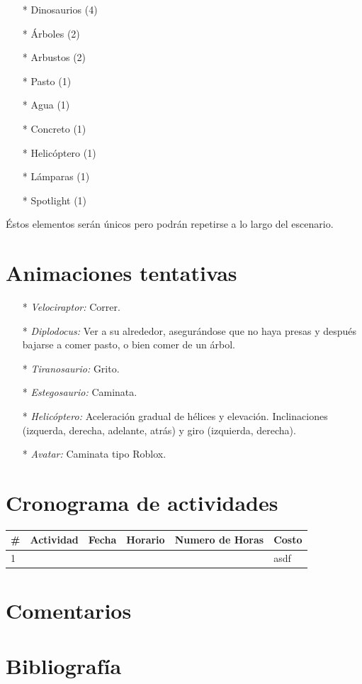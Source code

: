 \documentclass[12pt]{article} %
\begin{document}
	\begin{itemize}
		\item[*] Dinosaurios (4)
		\item[*] Árboles (2)
		\item[*] Arbustos (2)
		\item[*] Pasto (1)
		\item[*] Agua (1)
		\item[*] Concreto (1)
		\item[*] Helicóptero (1)
		\item[*] Lámparas (1)
		\item[*] Spotlight (1)
 	\end{itemize}
 	
 	Éstos elementos serán únicos pero podrán repetirse a lo largo del escenario.
 	
 	\section{Animaciones tentativas}
	
	\begin{itemize}
		\item[*] \emph{Velociraptor:} Correr.
		\item[*] \emph{Diplodocus:} Ver a su alrededor, asegurándose que no haya presas y después bajarse a comer pasto, 
					o bien comer de un árbol.
		\item[*] \emph{Tiranosaurio:} Grito.
		\item[*] \emph{Estegosaurio:} Caminata.
		\item[*] \emph{Helicóptero:} Aceleración gradual de hélices y elevación. 
				Inclinaciones (izquerda, derecha, adelante, atrás) y giro (izquierda, derecha).
		\item[*] \emph{Avatar:} Caminata tipo Roblox.
 	\end{itemize}
 	
 	\section{Cronograma de actividades}
 	
 	\begin{center}
		\begin{tabular}{ | m{5.5em} | m{5.5em} | m{5.5em} | m{5.5em} | m{5.5em} | m{5.5em} |}
			\hline
			\# & Actividad & Fecha & Horario & Numero de Horas & Costo \\ 
			\hline
			1 &  &  &  &  & asdf \\ 
			\hline
			
		\end{tabular}
	\end{center}
	
	\section{Comentarios}
 	
	\section{Bibliografía}
	
\end{document}
